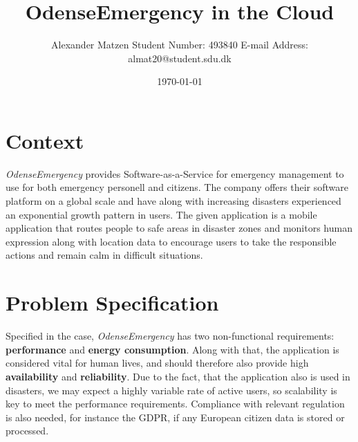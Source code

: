 \documentclass[11pt]{article}
\begin{document}
\setlength\parindent{0pt}
\setlength{\parskip}{.15em}
\pagestyle{empty}

\title{OdenseEmergency in the Cloud \newline}
\author{Alexander Matzen \addvspace{1em} Student Number: 493840 \newline E-mail Address: almat20@student.sdu.dk}
\date{\today}


\pagecolor{white}

\tableofcontents
\newpage

\section{Context}

\textit{OdenseEmergency} provides Software-as-a-Service for emergency management to use for both emergency personell and citizens. The company offers their software platform on a global scale and have along with increasing disasters experienced an exponential growth pattern in users.
\newline\newline
The given application is a mobile application that routes people to safe areas in disaster zones and monitors human expression along with location data to encourage users to take the responsible actions and remain calm in difficult situations.

\section{Problem Specification}

Specified in the case, \textit{OdenseEmergency} has two non-functional requirements: \textbf{performance} and \textbf{energy consumption}. Along with that, the application is considered vital for human lives, and should therefore also provide high \textbf{availability} and \textbf{reliability}.
\newline\newline
Due to the fact, that the application also is used in disasters, we may expect a highly variable rate of active users, so scalability is key to meet the performance requirements.
\newline\newline
Compliance with relevant regulation is also needed, for instance the GDPR, if any European citizen data is stored or processed.
\end{document}
